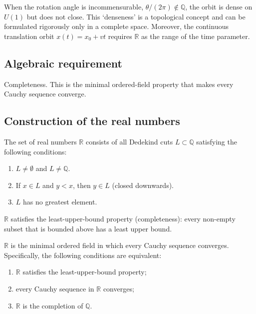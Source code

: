 When the rotation angle is incommensurable, $\theta/(2\pi) \notin \mathbb{Q}$, the orbit is dense on $U(1)$ but does not close. This `denseness' is a topological concept and can be formulated rigorously only in a complete space. Moreover, the continuous translation orbit $x(t) = x_0 + vt$ requires $\mathbb{R}$ as the range of the time parameter.

\subsection{\texorpdfstring{Algebraic requirement}{Algebraic requirement}}

Completeness. This is the minimal ordered-field property that makes every Cauchy sequence converge.

\subsection{\texorpdfstring{Construction of the real numbers}{Construction of the real numbers}}

\begin{definition}\label{def:real_construction}
The set of real numbers $\mathbb{R}$ consists of all Dedekind cuts $L \subset \mathbb{Q}$ satisfying the following conditions:
\begin{enumerate}[label=(\arabic*)]
    \item $L \neq \emptyset$ and $L \neq \mathbb{Q}$.
    \item If $x \in L$ and $y < x$, then $y \in L$ (closed downwards).
    \item $L$ has no greatest element.
\end{enumerate}
$\mathbb{R}$ satisfies the least-upper-bound property (completeness): every non-empty subset that is bounded above has a least upper bound.
\end{definition}

\begin{theorem}\label{thm:real_completeness}
$\mathbb{R}$ is the minimal ordered field in which every Cauchy sequence converges. Specifically, the following conditions are equivalent:
\begin{enumerate}[label=(\roman*)]
    \item $\mathbb{R}$ satisfies the least-upper-bound property;
    \item every Cauchy sequence in $\mathbb{R}$ converges;
    \item $\mathbb{R}$ is the completion of $\mathbb{Q}$.
\end{enumerate}
\end{theorem}

